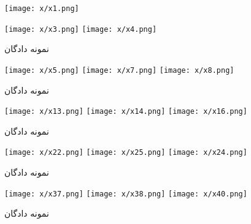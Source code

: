 
\appendix
\renewcommand{\chaptername}{پیوست}
\pagebreak
{}

\newpage



\begin{figure}[ht]
\centering     %

\texttt{[image: x/x1.png]}

\texttt{[image: x/x3.png]}
\texttt{[image: x/x4.png]}





\caption{نمونه دادگان}
\label{fig:append1}
\end{figure}


\vspace{-1cm}
\begin{figure}[ht]
\centering     %
\texttt{[image: x/x5.png]}
\texttt{[image: x/x7.png]}
\texttt{[image: x/x8.png]}

\caption{نمونه دادگان}
\label{fig:append2}
\end{figure}

\vspace{-1cm}
\begin{figure}[ht]
\centering     %
\texttt{[image: x/x13.png]}
\texttt{[image: x/x14.png]}
\texttt{[image: x/x16.png]}

\caption{نمونه دادگان}
\label{fig:append3}
\end{figure}


\vspace{-1cm}
\begin{figure}[ht]
\centering     %
\texttt{[image: x/x22.png]}
\texttt{[image: x/x25.png]}
\texttt{[image: x/x24.png]}

\caption{نمونه دادگان}
\label{fig:append4}
\end{figure}

\vspace{-1cm}
\begin{figure}[ht]
\centering     %
\texttt{[image: x/x37.png]}
\texttt{[image: x/x38.png]}
\texttt{[image: x/x40.png]}

\caption{نمونه دادگان}
\label{fig:append5}
\end{figure}

